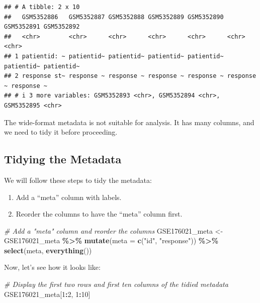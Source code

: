 \documentclass[
]{book}
\newenvironment{Shaded}{\begin{snugshade}}{\end{snugshade}}
\newcommand{\AttributeTok}[1]{\textcolor[rgb]{0.13,0.29,0.53}{#1}}
\newcommand{\CommentTok}[1]{\textcolor[rgb]{0.56,0.35,0.01}{\textit{#1}}}
\newcommand{\DecValTok}[1]{\textcolor[rgb]{0.00,0.00,0.81}{#1}}
\newcommand{\FunctionTok}[1]{\textcolor[rgb]{0.13,0.29,0.53}{\textbf{#1}}}
\newcommand{\NormalTok}[1]{#1}
\newcommand{\OtherTok}[1]{\textcolor[rgb]{0.56,0.35,0.01}{#1}}
\newcommand{\SpecialCharTok}[1]{\textcolor[rgb]{0.81,0.36,0.00}{\textbf{#1}}}
\newcommand{\StringTok}[1]{\textcolor[rgb]{0.31,0.60,0.02}{#1}}
\begin{document}
\begin{verbatim}
## # A tibble: 2 x 10
##   GSM5352886   GSM5352887 GSM5352888 GSM5352889 GSM5352890 GSM5352891 GSM5352892
##   <chr>        <chr>      <chr>      <chr>      <chr>      <chr>      <chr>     
## 1 patientid: ~ patientid~ patientid~ patientid~ patientid~ patientid~ patientid~
## 2 response st~ response ~ response ~ response ~ response ~ response ~ response ~
## # i 3 more variables: GSM5352893 <chr>, GSM5352894 <chr>, GSM5352895 <chr>
\end{verbatim}

The wide-format metadata is not suitable for analysis. It has many columns, and we need to tidy it before proceeding.

\hypertarget{tidying-the-metadata}{%
\subsection{Tidying the Metadata}\label{tidying-the-metadata}}

We will follow these steps to tidy the metadata:

\begin{enumerate}
\def\labelenumi{\arabic{enumi}.}
\item
  Add a ``meta'' column with labels.
\item
  Reorder the columns to have the ``meta'' column first.
\end{enumerate}

\begin{Shaded}
\begin{Highlighting}[]
\CommentTok{\# Add a "meta" column and reorder the columns}
\NormalTok{GSE176021\_meta }\OtherTok{\textless{}{-}}\NormalTok{ GSE176021\_meta }\SpecialCharTok{\%\textgreater{}\%}
  \FunctionTok{mutate}\NormalTok{(}\AttributeTok{meta =} \FunctionTok{c}\NormalTok{(}\StringTok{"id"}\NormalTok{, }\StringTok{"response"}\NormalTok{)) }\SpecialCharTok{\%\textgreater{}\%}
  \FunctionTok{select}\NormalTok{(meta, }\FunctionTok{everything}\NormalTok{())}
\end{Highlighting}
\end{Shaded}

Now, let's see how it looks like:

\begin{Shaded}
\begin{Highlighting}[]
\CommentTok{\# Display the first two rows and first ten columns of the tidied metadata}
\NormalTok{GSE176021\_meta[}\DecValTok{1}\SpecialCharTok{:}\DecValTok{2}\NormalTok{, }\DecValTok{1}\SpecialCharTok{:}\DecValTok{10}\NormalTok{]}
\end{Highlighting}
\end{Shaded}
\end{document}
